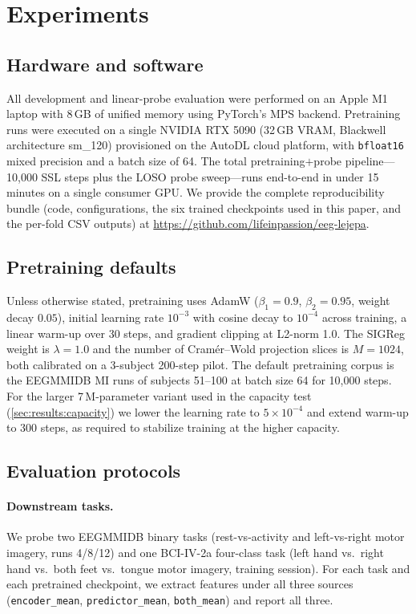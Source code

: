 \section{Experiments}
\label{sec:experiments}

\subsection{Hardware and software}

All development and linear-probe evaluation were performed on an Apple M1
laptop with 8\,GB of unified memory using PyTorch's MPS backend. Pretraining
runs were executed on a single NVIDIA RTX 5090 (32\,GB VRAM, Blackwell
architecture sm\_120) provisioned on the AutoDL cloud platform, with
\texttt{bfloat16} mixed precision and a batch size of 64. The total
pretraining$+$probe pipeline---10{,}000 SSL steps plus the LOSO probe
sweep---runs end-to-end in under 15 minutes on a single consumer GPU. We
provide the complete reproducibility bundle (code, configurations, the six
trained checkpoints used in this paper, and the per-fold CSV outputs) at
\url{https://github.com/lifeinpassion/eeg-lejepa}.

\subsection{Pretraining defaults}

Unless otherwise stated, pretraining uses AdamW
($\beta_1{=}0.9$, $\beta_2{=}0.95$, weight decay $0.05$), initial learning
rate $10^{-3}$ with cosine decay to $10^{-4}$ across training, a linear
warm-up over 30 steps, and gradient clipping at L2-norm 1.0. The SIGReg
weight is $\lambda{=}1.0$ and the number of Cram\'er--Wold projection
slices is $M{=}1024$, both calibrated on a 3-subject 200-step pilot. The
default pretraining corpus is the EEGMMIDB MI runs of subjects 51--100 at
batch size 64 for 10{,}000 steps. For the larger 7\,M-parameter variant
used in the capacity test (\cref{sec:results:capacity}) we lower the
learning rate to $5{\times}10^{-4}$ and extend warm-up to 300 steps, as
required to stabilize training at the higher capacity.

\subsection{Evaluation protocols}

\paragraph{Downstream tasks.}
We probe two EEGMMIDB binary tasks (rest-vs-activity and left-vs-right
motor imagery, runs 4/8/12) and one BCI-IV-2a four-class task (left
hand vs.\ right hand vs.\ both feet vs.\ tongue motor imagery, training
session). For each task and each pretrained checkpoint, we extract
features under all three sources (\texttt{encoder\_mean},
\texttt{predictor\_mean}, \texttt{both\_mean}) and report all three.

